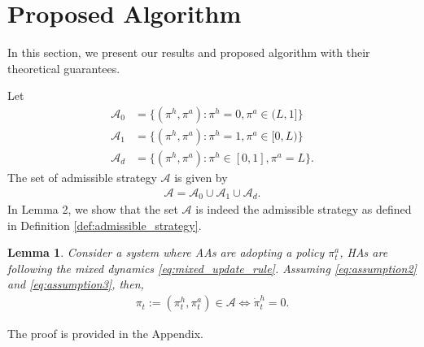 \documentclass[letterpaper]{article} %
\newtheorem{lemma}{Lemma}
\begin{document}
\section{Proposed Algorithm}
\label{sec:proposed_algorithm}
In this section, we present our results and proposed algorithm with their theoretical guarantees.

Let
\begin{align}
    \mathcal{A}_0&=\{(\pi^h,\pi^a):\pi^h=0,\pi^a\in(L,1]\}\label{eq:start_admissible}\\
    \mathcal{A}_1&=\{(\pi^h,\pi^a):\pi^h=1,\pi^a\in[0,L)\}\\
    \mathcal{A}_d&=\{(\pi^h,\pi^a):\pi^h\in[0,1],\pi^a=L\}.
\end{align}
The set of admissible strategy $\mathcal{A}$ is given by
\begin{align}
\label{eq:end_admissible}
    \mathcal{A}=\mathcal{A}_0\cup\mathcal{A}_1\cup\mathcal{A}_d.
\end{align}
In Lemma 2, we show that the set $\mathcal{A}$ is indeed the admissible strategy as defined in Definition \ref{def:admissible_strategy}.
\begin{lemma}
\label{lem:stop}
Consider a system where AAs are adopting a policy $\pi^a_t$, HAs are following the mixed dynamics \eqref{eq:mixed_update_rule}. Assuming \eqref{eq:assumption2} and \eqref{eq:assumption3}, then,
\begin{align}
\label{eq:threshold_conv}
    \pi_t:=(\pi^h_t,\pi^a_t)\in\mathcal{A}\Leftrightarrow\dot{\pi}^h_t=0.
\end{align}
\end{lemma}
The proof is provided in the Appendix.
\end{document}
